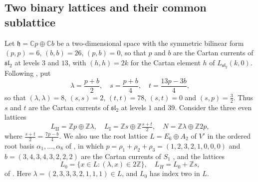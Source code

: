 \documentclass[leqno]{article}
\newcommand{\Cbb}{\ensuremath{\mathbb{C}}}
\newcommand{\Z}{\ensuremath{\mathbb{Z}}}
\numberwithin{equation}{section}
\begin{document}
\subsection{Two binary lattices and their common sublattice}
\label{subsec:lattices}

Let $\mathfrak h = \Cbb p \oplus \Cbb b$ be a two-dimensional space with the symmetric bilinear form $(p,p) = 6$, $(b,b) = 26$, $(p,b) = 0$, so that $p$ and $b$ are the Cartan currents of $\mathfrak{sl}_2$ at levels $3$ and $13$, with $(h,h) = 2k$ for the Cartan element $h$ of $L_{\mathfrak{sl}_2}(k,0)$. Following \cite[Section 5]{DJX26}, put
\begin{equation}
\label{eq:lattice-vectors}
\lambda = \frac{p+b}{2},
\quad
s = \frac{p+b}{4},
\quad
t = \frac{13p-3b}{4},
\end{equation}
so that $(\lambda,\lambda) = 8$, $(s,s) = 2$, $(t,t) = 78$, $(s,t) = 0$ and $(s,p) = \frac32$. Thus $s$ and $t$ are the Cartan currents of $\mathfrak{sl}_2$ at levels $1$ and $39$. Consider the three even lattices
\begin{equation}
\label{eq:three-lattices}
L_{\mathrm{II}} = \Z p \oplus \Z\lambda,
\quad
L_{\mathrm I} = \Z s \oplus \Z\tfrac{s+t}{2},
\quad
N = \Z\lambda \oplus \Z 2p,
\end{equation}
where $\frac{s+t}{2} = \frac{7p-b}{4}$. We also use the root lattice $L = E_6 \oplus A_2$ of $V'$ in the ordered root basis $\alpha_1,\ldots,\alpha_8$ of \cite[(4.1)]{DJX26}, in which $p = \rho_1+\rho_2+\rho_3 = (1,2,3,2,1,0,0,0)$ and $b = (3,4,3,4,3,2,2,2)$ are the Cartan currents of $S_1$ \cite[Section 4.3]{DJX26}, and the lattices
\begin{equation}
\label{eq:L0-LH}
L_0 = \{x \in L : (\lambda,x) \in 2\Z\},
\quad
L_H = L_0+\Z s,
\end{equation}
of \cite[Section 5]{DJX26}. Here $\lambda = (2,3,3,3,2,1,1,1) \in L$, and $L_0$ has index two in $L$.
\end{document}
